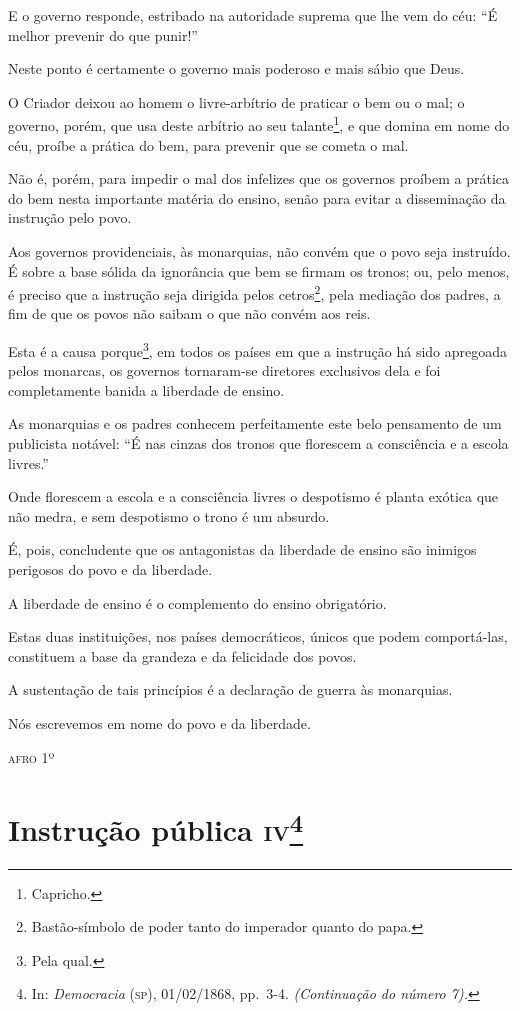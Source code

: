 E o governo responde, estribado na autoridade suprema que lhe vem do
céu: ``É melhor prevenir do que punir!''

Neste ponto é certamente o governo mais poderoso e mais sábio que Deus.

O Criador deixou ao homem o livre-arbítrio de praticar o bem ou o mal; o
governo, porém, que usa deste arbítrio ao seu talante\footnote{
  Capricho.}, e que domina em nome do céu, proíbe a prática do bem, para
prevenir que se cometa o mal.

Não é, porém, para impedir o mal dos infelizes que os governos proíbem a
prática do bem nesta importante matéria do ensino, senão para evitar a
disseminação da instrução pelo povo.

Aos governos providenciais, às monarquias, não convém que o povo seja
instruído. É sobre a base sólida da ignorância que bem se firmam os
tronos; ou, pelo menos, é preciso que a instrução seja dirigida pelos
cetros\footnote{Bastão-símbolo de poder tanto do imperador quanto do
  papa.}, pela mediação dos padres, a fim de que os povos não saibam o
que não convém aos reis.

Esta é a causa porque\footnote{Pela qual.}, em todos os países em que
a instrução há sido apregoada pelos monarcas, os governos tornaram-se
diretores exclusivos dela e foi completamente banida a liberdade de
ensino.

As monarquias e os padres conhecem perfeitamente este belo pensamento de
um publicista notável: ``É nas cinzas dos tronos que florescem a
consciência e a escola livres.''

Onde florescem a escola e a consciência livres o despotismo é planta
exótica que não medra, e sem despotismo o trono é um absurdo.

É, pois, concludente que os antagonistas da liberdade de ensino são
inimigos perigosos do povo e da liberdade.

A liberdade de ensino é o complemento do ensino obrigatório.

Estas duas instituições, nos países democráticos, únicos que podem
comportá-las, constituem a base da grandeza e da felicidade dos povos.

A sustentação de tais princípios é a declaração de guerra às monarquias.

Nós escrevemos em nome do povo e da liberdade.
\begin{flushright}
\textsc{afro} 1º
\end{flushright}
\chapter{Instrução pública \textsc{iv}\footnote{In: \emph{Democracia} (\textsc{sp}),
  01/02/1868, pp.~3-4. \emph{(Continuação do número 7).}}}

